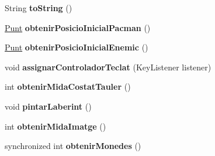 \begin{DoxyCompactItemize}
\item 
\hypertarget{classlogica_1_1laberints_1_1_laberint_a445a31e1cf30bacd1c7c8b71b41f2941}{String {\bfseries to\+String} ()}\label{classlogica_1_1laberints_1_1_laberint_a445a31e1cf30bacd1c7c8b71b41f2941}

\item 
\hypertarget{classlogica_1_1laberints_1_1_laberint_a2d77a17c6bff1915eadbde709255169a}{\hyperlink{classlogica_1_1_punt}{Punt} {\bfseries obtenir\+Posicio\+Inicial\+Pacman} ()}\label{classlogica_1_1laberints_1_1_laberint_a2d77a17c6bff1915eadbde709255169a}

\item 
\hypertarget{classlogica_1_1laberints_1_1_laberint_ad42c2fd34f5287a44177544772fe06b8}{\hyperlink{classlogica_1_1_punt}{Punt} {\bfseries obtenir\+Posicio\+Inicial\+Enemic} ()}\label{classlogica_1_1laberints_1_1_laberint_ad42c2fd34f5287a44177544772fe06b8}

\item 
\hypertarget{classlogica_1_1laberints_1_1_laberint_abbda03bcf4c8a1efead70f997d7357cb}{void {\bfseries assignar\+Controlador\+Teclat} (Key\+Listener listener)}\label{classlogica_1_1laberints_1_1_laberint_abbda03bcf4c8a1efead70f997d7357cb}

\item 
\hypertarget{classlogica_1_1laberints_1_1_laberint_a9c8bcefff67ad264c9c68f3d77f951c8}{int {\bfseries obtenir\+Mida\+Costat\+Tauler} ()}\label{classlogica_1_1laberints_1_1_laberint_a9c8bcefff67ad264c9c68f3d77f951c8}

\item 
\hypertarget{classlogica_1_1laberints_1_1_laberint_ab3dc6c50c9899e1efbe9bb8e2798718f}{void {\bfseries pintar\+Laberint} ()}\label{classlogica_1_1laberints_1_1_laberint_ab3dc6c50c9899e1efbe9bb8e2798718f}

\item 
\hypertarget{classlogica_1_1laberints_1_1_laberint_a2208d4cfbf40d57c7dd05cf4996c661d}{int {\bfseries obtenir\+Mida\+Imatge} ()}\label{classlogica_1_1laberints_1_1_laberint_a2208d4cfbf40d57c7dd05cf4996c661d}

\item 
\hypertarget{classlogica_1_1laberints_1_1_laberint_abd37167c2c8d87ad1e9d0e177585b12b}{synchronized int {\bfseries obtenir\+Monedes} ()}\label{classlogica_1_1laberints_1_1_laberint_abd37167c2c8d87ad1e9d0e177585b12b}

\end{DoxyCompactItemize}
